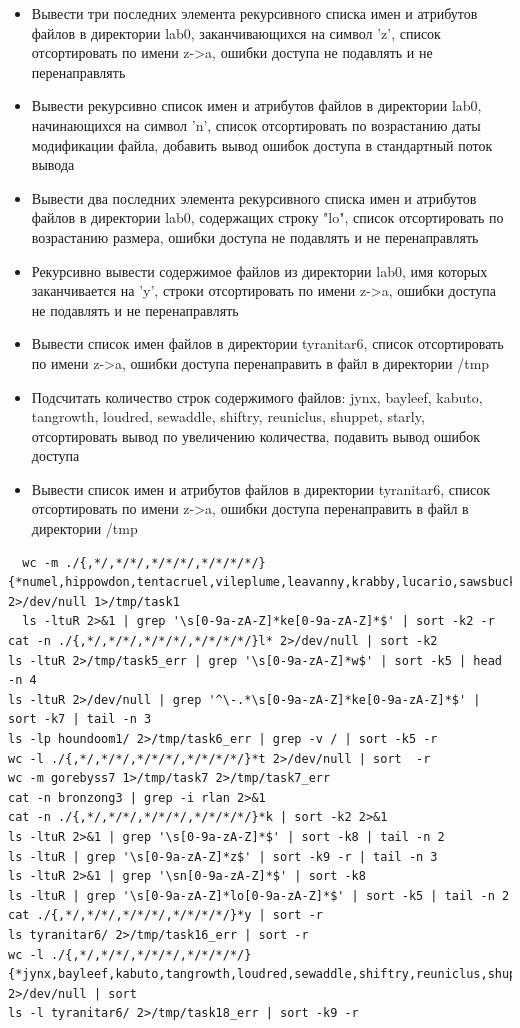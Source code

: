 \documentclass{article}
\begin{document}
\begin{itemize}
  \item Вывести три последних элемента рекурсивного списка имен и атрибутов файлов в директории lab0, заканчивающихся на символ 'z', список отсортировать по имени z->a, ошибки доступа не подавлять и не перенаправлять
  \item Вывести рекурсивно список имен и атрибутов файлов в директории lab0, начинающихся на символ 'n', список отсортировать по возрастанию даты модификации файла, добавить вывод ошибок доступа в стандартный поток вывода
  \item Вывести два последних элемента рекурсивного списка имен и атрибутов файлов в директории lab0, содержащих строку "lo", список отсортировать по возрастанию размера, ошибки доступа не подавлять и не перенаправлять
  \item Рекурсивно вывести содержимое файлов из директории lab0, имя которых заканчивается на 'y', строки отсортировать по имени z->a, ошибки доступа не подавлять и не перенаправлять
  \item Вывести список имен файлов в директории tyranitar6, список отсортировать по имени z->a, ошибки доступа перенаправить в файл в директории /tmp
  \item Подсчитать количество строк содержимого файлов: jynx, bayleef, kabuto, tangrowth, loudred, sewaddle, shiftry, reuniclus, shuppet, starly, отсортировать вывод по увеличению количества, подавить вывод ошибок доступа
  \item Вывести список имен и атрибутов файлов в директории tyranitar6, список отсортировать по имени z->a, ошибки доступа перенаправить в файл в директории /tmp
\end{itemize}

\begin{lstlisting}
  wc -m ./{,*/,*/*/,*/*/*/,*/*/*/*/}{*numel,hippowdon,tentacruel,vileplume,leavanny,krabby,lucario,sawsbuck,golett,monferno} 2>/dev/null 1>/tmp/task1
  ls -ltuR 2>&1 | grep '\s[0-9a-zA-Z]*ke[0-9a-zA-Z]*$' | sort -k2 -r
cat -n ./{,*/,*/*/,*/*/*/,*/*/*/*/}l* 2>/dev/null | sort -k2
ls -ltuR 2>/tmp/task5_err | grep '\s[0-9a-zA-Z]*w$' | sort -k5 | head -n 4
ls -ltuR 2>/dev/null | grep '^\-.*\s[0-9a-zA-Z]*ke[0-9a-zA-Z]*$' | sort -k7 | tail -n 3
ls -lp houndoom1/ 2>/tmp/task6_err | grep -v / | sort -k5 -r
wc -l ./{,*/,*/*/,*/*/*/,*/*/*/*/}*t 2>/dev/null | sort  -r
wc -m gorebyss7 1>/tmp/task7 2>/tmp/task7_err
cat -n bronzong3 | grep -i rlan 2>&1
cat -n ./{,*/,*/*/,*/*/*/,*/*/*/*/}*k | sort -k2 2>&1
ls -ltuR 2>&1 | grep '\s[0-9a-zA-Z]*$' | sort -k8 | tail -n 2
ls -ltuR | grep '\s[0-9a-zA-Z]*z$' | sort -k9 -r | tail -n 3
ls -ltuR 2>&1 | grep '\sn[0-9a-zA-Z]*$' | sort -k8
ls -ltuR | grep '\s[0-9a-zA-Z]*lo[0-9a-zA-Z]*$' | sort -k5 | tail -n 2
cat ./{,*/,*/*/,*/*/*/,*/*/*/*/}*y | sort -r
ls tyranitar6/ 2>/tmp/task16_err | sort -r
wc -l ./{,*/,*/*/,*/*/*/,*/*/*/*/}{*jynx,bayleef,kabuto,tangrowth,loudred,sewaddle,shiftry,reuniclus,shuppet,starly} 2>/dev/null | sort
ls -l tyranitar6/ 2>/tmp/task18_err | sort -k9 -r
\end{lstlisting}
\end{document}
